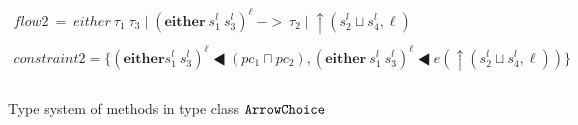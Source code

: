 \documentclass{report}
\newcommand{\co}[1]{$\cod{#1}$}
\newcommand{\sts}[1]{s_{#1}^l}
\newcommand{\sleql}{\LHD}
\newcommand{\tagup}{\uparrow}
\newcommand{\typn}[1]{\tau_{#1}}
\newcommand{\res}[2]{{#1}\mid {#2}}
\begin{document}
\begin{figure*}[t]
\[\begin{array}{c}
    flow2~=~\res{either\ \typn{1}\ \typn{3}}{(\mathbf{either}\ \sts{1}\ \sts{3})^\ell}~->~
            \res{\typn{2}}{\tagup (\sts{2}\sqcup \sts{4},\ell)} \\ \\

    constraint2 = \{(\mathbf{either} \sts{1}\ \sts{3})^\ell\sleql (pc_1\sqcap pc_2),
                   (\mathbf{either}\ \sts{1}\ \sts{3})^\ell\sleql e(\tagup (\sts{2}\sqcup \sts{4},\ell)) \} \\ \\
%
    \end{array}
  \]
\caption{Type system of methods in type class \co{ArrowChoice}}
\label{fig:flowarrowref:typesystem1}
\end{figure*}
\end{document}
